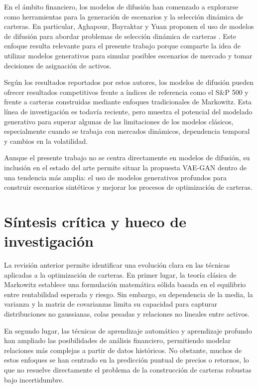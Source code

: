 En el ámbito financiero, los modelos de difusión han comenzado a explorarse como herramientas para la generación de escenarios y la selección dinámica de carteras. En particular, Aghapour, Bayraktar y Yuan proponen el uso de modelos de difusión para abordar problemas de selección dinámica de carteras \cite{aghapour2025solving}. Este enfoque resulta relevante para el presente trabajo porque comparte la idea de utilizar modelos generativos para simular posibles escenarios de mercado y tomar decisiones de asignación de activos.

Según los resultados reportados por estos autores, los modelos de difusión pueden ofrecer resultados competitivos frente a índices de referencia como el S\&P 500 y frente a carteras construidas mediante enfoques tradicionales de Markowitz. Esta línea de investigación es todavía reciente, pero muestra el potencial del modelado generativo para superar algunas de las limitaciones de los modelos clásicos, especialmente cuando se trabaja con mercados dinámicos, dependencia temporal y cambios en la volatilidad.

Aunque el presente trabajo no se centra directamente en modelos de difusión, su inclusión en el estado del arte permite situar la propuesta VAE-GAN dentro de una tendencia más amplia: el uso de modelos generativos profundos para construir escenarios sintéticos y mejorar los procesos de optimización de carteras.

\section{Síntesis crítica y hueco de investigación}

La revisión anterior permite identificar una evolución clara en las técnicas aplicadas a la optimización de carteras. En primer lugar, la teoría clásica de Markowitz establece una formulación matemática sólida basada en el equilibrio entre rentabilidad esperada y riesgo. Sin embargo, su dependencia de la media, la varianza y la matriz de covarianzas limita su capacidad para capturar distribuciones no gaussianas, colas pesadas y relaciones no lineales entre activos.

En segundo lugar, las técnicas de aprendizaje automático y aprendizaje profundo han ampliado las posibilidades de análisis financiero, permitiendo modelar relaciones más complejas a partir de datos históricos. No obstante, muchos de estos enfoques se han centrado en la predicción puntual de precios o retornos, lo que no resuelve directamente el problema de la construcción de carteras robustas bajo incertidumbre.

